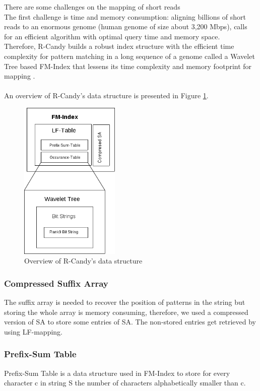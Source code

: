 \documentclass[11pt,a4paper]{report}
\begin{document}
There are some challenges on the mapping of short reads\\
The first challenge is time and memory consumption: aligning billions of short
reads to an enormous genome (human genome of size about 3,200 Mbps), 
calls for an efficient algorithm with optimal query time and memory space.\\
Therefore, R-Candy builds a robust index structure with 
the efficient time complexity for pattern matching in a long sequence of a genome
called a Wavelet Tree based FM-Index that lessens its time complexity and memory footprint for mapping . 
\\\\
An overview of R-Candy's data structure is presented in Figure \ref{DSOverview}\cite{Wavthesis}.\\

\begin{figure}[H]
\centering
\includegraphics[width=4.75cm]{pictures/DSOverview2.png}
\caption{Overview of R-Candy's data structure }
\label{DSOverview}
\end{figure}


\subsubsection{Compressed Suffix Array} \label{Compressed Suffix Array}
The suffix array is needed to recover the position of patterns in the string
but storing the whole array is memory consuming, therefore, we used a
compressed version of SA to store some entries of SA.
The non-stored entries get retrieved by using LF-mapping.

\subsubsection{Prefix-Sum Table} \label{Prefix-Sum Table}
Prefix-Sum Table is a data structure used in FM-Index to store for every 
character c in string S the number of characters alphabetically smaller than c.
\end{document}
